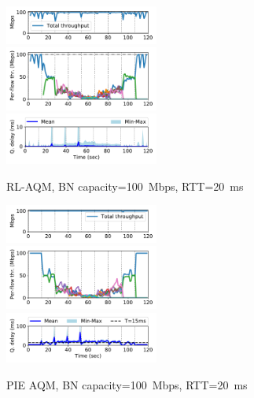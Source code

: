 \documentclass[conference]{IEEEtran}
\begin{document}
\begin{figure}[ht]
\begin{center}
\includegraphics[width=0.45\textwidth]{Figures/rl_100mbps_10ms_total.pdf} \\
\includegraphics[width=0.45\textwidth]{Figures/rl_100mbps_10ms_flow.pdf} \\
\includegraphics[width=0.45\textwidth]{Figures/rl_100mbps_10ms_delay.pdf}
\end{center}
\caption{RL-AQM, BN capacity=100~Mbps, RTT=20~ms}
\label{fig:rl100mbps20ms}
\end{figure}

\begin{figure}[ht]
\begin{center}
\includegraphics[width=0.45\textwidth]{Figures/pie_100mbps_10ms_total.pdf} \\
\includegraphics[width=0.45\textwidth]{Figures/pie_100mbps_10ms_flow.pdf} \\
\includegraphics[width=0.45\textwidth]{Figures/pie_100mbps_10ms_delay.pdf}
\end{center}
\caption{PIE AQM, BN capacity=100~Mbps, RTT=20~ms}
\label{fig:pie100mbps20ms}
\end{figure}
\end{document}
